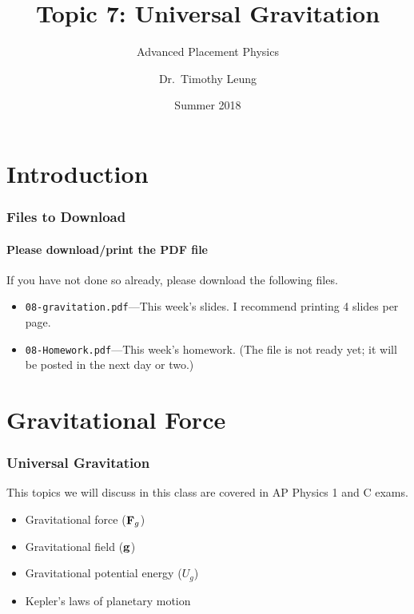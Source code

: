 \documentclass[12pt,compress,aspectratio=169]{beamer}
\title{Topic 7: Universal Gravitation}
\subtitle{Advanced Placement Physics}
\author[TML]{Dr.\ Timothy Leung}
\institute{Olympiads School}
\date{Summer 2018}
\newcommand{\mb}[1]{\ensuremath\mathbf{#1}}
\begin{document}
\begin{frame}
  \maketitle
\end{frame}


\section[Intro]{Introduction}

\begin{frame}
  \frametitle{Files to Download}
  \framesubtitle{Please download/print the PDF file}
  If you have not done so already, please download the following files.
  \begin{itemize}
  \item\texttt{08-gravitation.pdf}---This week's
    slides. I recommend printing 4 slides per page.
  \item\texttt{08-Homework.pdf}---This week's homework. (The file is not ready
    yet; it will be posted in the next day or two.)
  \end{itemize}
\end{frame}





\section{Gravitational Force}
\begin{frame}
  \frametitle{Universal Gravitation}
  This topics we will discuss in this class are covered in AP Physics 1 and
  C exams.
  \begin{itemize}
  \item Gravitational force ($\mb{F}_g$)
  \item Gravitational field ($\mb{g}$)
  \item Gravitational potential energy  ($U_g$)
  \item Kepler's laws of planetary motion
  \end{itemize}
\end{frame}
\end{document}
